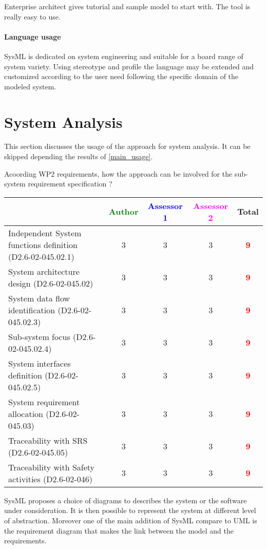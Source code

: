 Enterprise architect gives tutorial and sample model to start
with. The tool is really easy to use.

\paragraph{Language usage} 
SysML is dedicated on system engineering and suitable for a board range of
system variety. Using stereotype and profile the language may be
extended and customized according to the user need following the
specific domain of the modeled system.


\section{System Analysis}
This section discusses the usage of the approach for system analysis.
It can be skipped depending the results of \ref{main_usage}.

Acoording WP2 requirements, how the approach can be involved for the sub-system requirement specification ?

\begin{tabular}{|l | c | c | c | c|}
\hline
& \textcolor{green}{Author} & \textcolor{blue}{Assessor 1} & \textcolor{magenta}{Assessor 2} & Total \\
\hline
Independent System functions definition (D2.6-02-045.02.1)  &3 & 3    & 3     & \textcolor{red}{\textbf{9}} \\
\hline 
System architecture design (D2.6-02-045.02) &3 & 3    & 3    & \textcolor{red}{\textbf{9}} \\
\hline
System data flow identification (D2.6-02-045.02.3)  &3 & 3    & 3    & \textcolor{red}{\textbf{9}} \\
\hline
Sub-system focus (D2.6-02-045.02.4)  &3 & 3    & 3    & \textcolor{red}{\textbf{9}} \\
\hline
System interfaces definition (D2.6-02-045.02.5)  &3 & 3    & 3    & \textcolor{red}{\textbf{9}} \\
\hline
System requirement allocation (D2.6-02-045.03)  &3 & 3    & 3    & \textcolor{red}{\textbf{9}}  \\
\hline
Traceability with SRS (D2.6-02-045.05)  &3 & 3    & 3    & \textcolor{red}{\textbf{9}}  \\
\hline
Traceability with Safety activities (D2.6-02-046)  &3 & 3    & 3    & \textcolor{red}{\textbf{9}} \\
\hline
\end{tabular}
\begin{author_comment}
  SysML proposes a choice of diagrams to describes the system or the
  software under consideration. It is then possible to represent the
  system at different level of abstraction. Moreover one of the main
  addition of SysML compare to UML is the requirement diagram that
  makes the link between the model and the requirements.
\end{author_comment}


